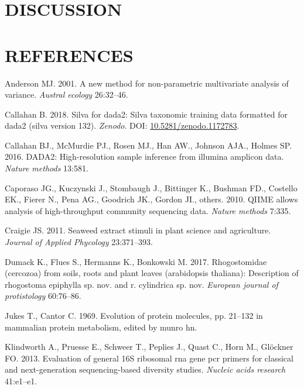\documentclass[11pt,]{article}
\begin{document}
\section{DISCUSSION}\label{discussion}

\newpage  

\section*{REFERENCES}\label{references}

\hypertarget{refs}{}
\hypertarget{ref-anderson2001new}{}
Anderson MJ. 2001. A new method for non-parametric multivariate analysis
of variance. \emph{Austral ecology} 26:32--46.

\hypertarget{ref-silva}{}
Callahan B. 2018. Silva for dada2: Silva taxonomic training data
formatted for dada2 (silva version 132). \emph{Zenodo}. DOI:
\href{https://doi.org/10.5281/zenodo.1172783}{10.5281/zenodo.1172783}.

\hypertarget{ref-callahan2016dada2}{}
Callahan BJ., McMurdie PJ., Rosen MJ., Han AW., Johnson AJA., Holmes SP.
2016. DADA2: High-resolution sample inference from illumina amplicon
data. \emph{Nature methods} 13:581.

\hypertarget{ref-caporaso2010qiime}{}
Caporaso JG., Kuczynski J., Stombaugh J., Bittinger K., Bushman FD.,
Costello EK., Fierer N., Pena AG., Goodrich JK., Gordon JI., others.
2010. QIIME allows analysis of high-throughput community sequencing
data. \emph{Nature methods} 7:335.

\hypertarget{ref-craigie2011seaweed}{}
Craigie JS. 2011. Seaweed extract stimuli in plant science and
agriculture. \emph{Journal of Applied Phycology} 23:371--393.

\hypertarget{ref-dumack2017rhogostomidae}{}
Dumack K., Flues S., Hermanns K., Bonkowski M. 2017. Rhogostomidae
(cercozoa) from soils, roots and plant leaves (arabidopsis thaliana):
Description of rhogostoma epiphylla sp. nov. and r. cylindrica sp. nov.
\emph{European journal of protistology} 60:76--86.

\hypertarget{ref-jukes1969evolution}{}
Jukes T., Cantor C. 1969. Evolution of protein molecules, pp. 21--132 in
mammalian protein metabolism, edited by munro hn.

\hypertarget{ref-klindworth2013evaluation}{}
Klindworth A., Pruesse E., Schweer T., Peplies J., Quast C., Horn M.,
Glöckner FO. 2013. Evaluation of general 16S ribosomal rna gene pcr
primers for classical and next-generation sequencing-based diversity
studies. \emph{Nucleic acids research} 41:e1--e1.
\end{document}
